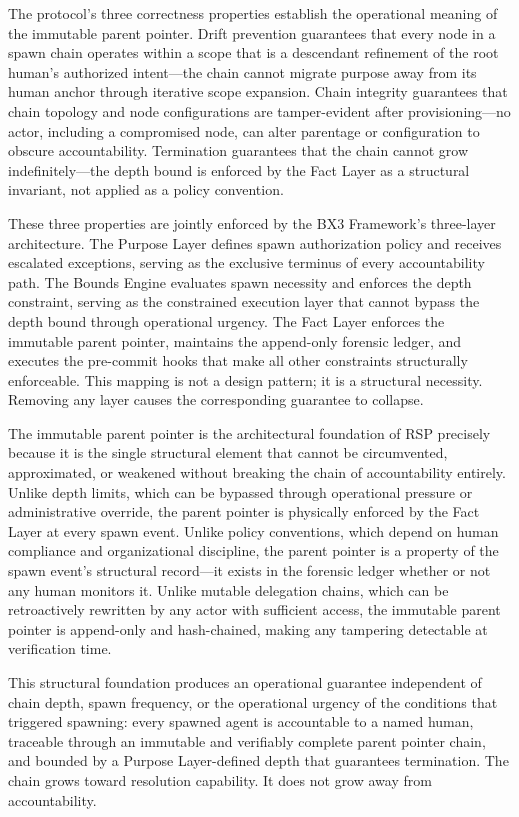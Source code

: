 The protocol's three correctness properties establish the operational meaning of the immutable parent pointer. Drift prevention guarantees that every node in a spawn chain operates within a scope that is a descendant refinement of the root human's authorized intent—the chain cannot migrate purpose away from its human anchor through iterative scope expansion. Chain integrity guarantees that chain topology and node configurations are tamper-evident after provisioning—no actor, including a compromised node, can alter parentage or configuration to obscure accountability. Termination guarantees that the chain cannot grow indefinitely—the depth bound is enforced by the Fact Layer as a structural invariant, not applied as a policy convention.

These three properties are jointly enforced by the BX3 Framework's three-layer architecture. The Purpose Layer defines spawn authorization policy and receives escalated exceptions, serving as the exclusive terminus of every accountability path. The Bounds Engine evaluates spawn necessity and enforces the depth constraint, serving as the constrained execution layer that cannot bypass the depth bound through operational urgency. The Fact Layer enforces the immutable parent pointer, maintains the append-only forensic ledger, and executes the pre-commit hooks that make all other constraints structurally enforceable. This mapping is not a design pattern; it is a structural necessity. Removing any layer causes the corresponding guarantee to collapse.

The immutable parent pointer is the architectural foundation of RSP precisely because it is the single structural element that cannot be circumvented, approximated, or weakened without breaking the chain of accountability entirely. Unlike depth limits, which can be bypassed through operational pressure or administrative override, the parent pointer is physically enforced by the Fact Layer at every spawn event. Unlike policy conventions, which depend on human compliance and organizational discipline, the parent pointer is a property of the spawn event's structural record—it exists in the forensic ledger whether or not any human monitors it. Unlike mutable delegation chains, which can be retroactively rewritten by any actor with sufficient access, the immutable parent pointer is append-only and hash-chained, making any tampering detectable at verification time.

This structural foundation produces an operational guarantee independent of chain depth, spawn frequency, or the operational urgency of the conditions that triggered spawning: every spawned agent is accountable to a named human, traceable through an immutable and verifiably complete parent pointer chain, and bounded by a Purpose Layer-defined depth that guarantees termination. The chain grows toward resolution capability. It does not grow away from accountability.

